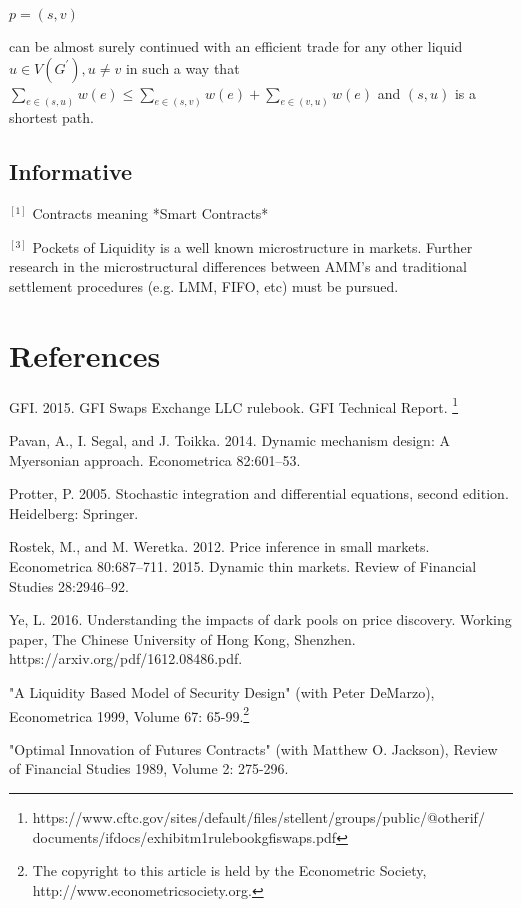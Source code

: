 $p=(s, v)$ 

can be almost surely continued with an efficient trade for any other liquid $u \in V\left(G^{\prime}\right), u \neq v$ in such a way that $\sum_{e \in(s, u)} w(e) \leq \sum_{e \in(s, v)} w(e)+\sum_{e \in(v, u)} w(e)$ and $(s, u)$ is
a shortest path.


\subsection{Informative}

$^[1]$ Contracts meaning *Smart Contracts*

$^[3]$ Pockets of Liquidity is a well known microstructure in markets. Further research in the microstructural differences between AMM's and traditional settlement procedures (e.g. LMM, FIFO, etc) must be pursued.



\newpage

\section{References}

GFI. 2015. GFI Swaps Exchange LLC rulebook. GFI Technical Report.
\footnote{https://www.cftc.gov/sites/default/files/stellent/groups/public/@otherif/
documents/ifdocs/exhibitm1rulebookgfiswaps.pdf}


Pavan, A., I. Segal, and J. Toikka. 2014. Dynamic mechanism design: A Myersonian approach.
Econometrica 82:601–53.

Protter, P. 2005. Stochastic integration and diﬀerential equations, second edition. Heidelberg:
Springer.

Rostek, M., and M. Weretka. 2012. Price inference in small markets. Econometrica 80:687–711.
2015. Dynamic thin markets. Review of Financial Studies 28:2946–92.


Ye, L. 2016. Understanding the impacts of dark pools on price discovery. Working paper, The
Chinese University of Hong Kong, Shenzhen. https://arxiv.org/pdf/1612.08486.pdf.

"A Liquidity Based Model of Security Design" (with Peter DeMarzo), Econometrica 1999, Volume 67: 65-99.\footnote{The copyright to this article is held by the Econometric Society, http://www.econometricsociety.org.}

"Optimal Innovation of Futures Contracts" (with Matthew O. Jackson), Review of Financial Studies 
1989, Volume 2: 275-296.

